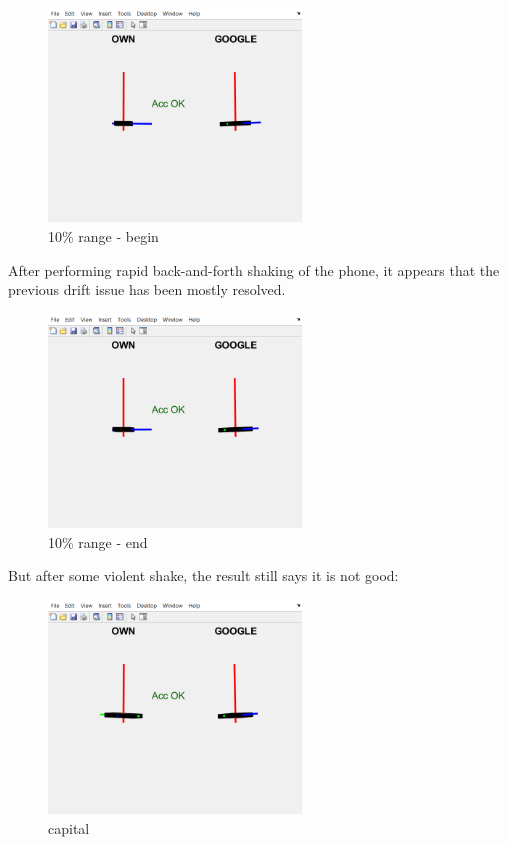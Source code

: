 \begin{figure}[H]
 \centering
 \includegraphics[width=0.6\textwidth]{images/new10begin.png}
 \caption{10\% range - begin}
 \label{label}
\end{figure}

After performing rapid back-and-forth shaking of the phone, it appears that the previous drift issue has been mostly resolved.

\begin{figure}[H]
 \centering
 \includegraphics[width=0.6\textwidth]{images/10rangeshake.png}
 \caption{10\% range - end}
 \label{label}
\end{figure}

But after some violent shake, the result still says it is not good:

\begin{figure}[H]
 \centering
 \includegraphics[width=0.6\textwidth]{images/violent10.png}
 \caption{capital}
 \label{label}
\end{figure}


